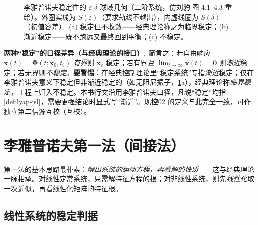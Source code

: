\begin{figure}[H]
\caption{李雅普诺夫稳定性的 $\varepsilon$-$\delta$ 球域几何（二阶系统，仿刘豹\cite{liubao2006modern} 图 4.1--4.3 重绘）。外圈实线为 $S(\varepsilon)$（要求轨线不越出），内虚线圈为 $S(\delta)$（初值容差）。(a) 稳定但不收敛——经典理论称之为临界稳定；(b) 渐近稳定——既不跑远又最终回到平衡；(c) 不稳定。}
\label{fig:lyap-ball-domain}
\end{figure}

\begin{note}
\textbf{两种“稳定”的口径差异（与经典理论的接口）.}\;
简言之：若自由响应 $\mathbf{x}(t)=\boldsymbol\Phi(t;\mathbf{x}_0,t_0)$ \emph{有界}则 $\mathbf{x}_e$ 稳定；若有界\emph{且} $\lim_{t\to\infty}\mathbf{x}(t)=\mathbf{0}$ 则\emph{渐近}稳定；若无界则\emph{不稳定}。\textbf{要警惕}：在经典控制理论里“稳定系统”专指\emph{渐近}稳定；仅在李雅普诺夫意义下稳定但非渐近稳定的（如无阻尼振子，\cref{fig:lyap-ball-domain}a），经典理论称\emph{临界稳定}，工程上归入不稳定。本书行文沿用李雅普诺夫口径，凡说“稳定”均指 \cref{def:lyap-isl}，需要更强结论时显式写“渐近”。现控02\cite{zhang2017modern} 的定义与此完全一致，可作独立第二信源互校（互校）。
\end{note}

\section{李雅普诺夫第一法（间接法）}
\label{sec:lyap-first}

第一法的基本思路最朴素：\emph{解出系统的运动方程，再看解的性质}——这与经典理论一脉相承。对线性定常系统，只需解特征方程的根；对非线性系统，则先\emph{线性化}取一次近似，再看线性化矩阵的特征根。

\subsection{线性系统的稳定判据}
\label{sec:lyap-first-linear}

